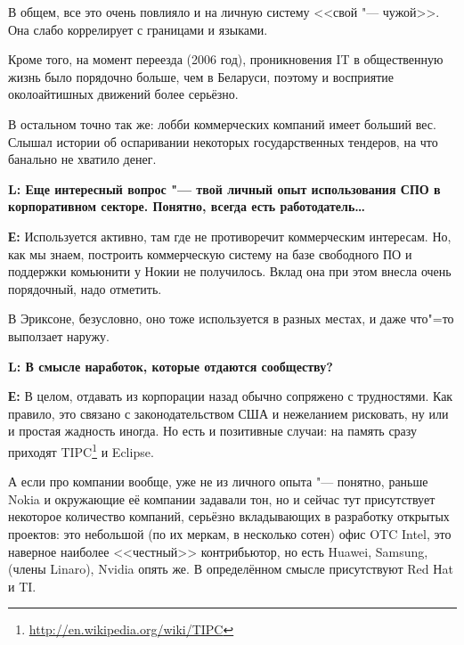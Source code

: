 \documentclass[10pt, a5paper]{article}
\begin{document}
В общем, все это очень повлияло и на личную систему <<свой "--- чужой>>. Она слабо коррелирует с границами и языками.

Кроме того, на момент переезда (2006 год), проникновения IT в общественную жизнь было порядочно больше, чем в Беларуси, поэтому и восприятие околоайтишных движений более серьёзно.

В остальном точно так же: лобби коммерческих компаний имеет больший вес. Слышал истории об оспаривании некоторых государственных тендеров, на что банально не хватило денег.

{\noindent \bf L: Еще интересный вопрос "--- твой личный опыт использования СПО в корпоративном секторе. Понятно, всегда есть работодатель\ldots}

{\noindent \bf Е:} Используется активно, там где не противоречит коммерческим интересам. Но, как мы знаем, построить коммерческую систему на базе свободного ПО и поддержки
комьюнити у Нокии не получилось. Вклад она при этом внесла очень порядочный, надо отметить.

В Эриксоне, безусловно, оно тоже используется в разных местах, и даже что"=то выползает наружу. 

{\noindent \bf L: В смысле наработок, которые отдаются сообществу?}

{\noindent \bf Е:} В целом, отдавать из корпорации назад обычно сопряжено с трудностями. Как правило, это связано с законодательством США и нежеланием рисковать, ну или и простая жадность иногда. Но есть и позитивные случаи: на память сразу приходят TIPC\footnote{\url{http://en.wikipedia.org/wiki/TIPC}} и \linebreak Eclipse.

А если про компании вообще, уже не из личного опыта "--- понятно, раньше Nokia и окружающие её компании задавали тон, но и сейчас тут присутствует некоторое количество компаний, серьёзно вкладывающих в разработку открытых проектов: это небольшой (по их меркам, в несколько сотен) офис OTC Intel, это наверное наиболее <<честный>> контрибьютор, но есть Huawei, Samsung, (члены Linaro), Nvidia опять же. В определённом смысле присутствуют Red Нat и TI.
\end{document}
